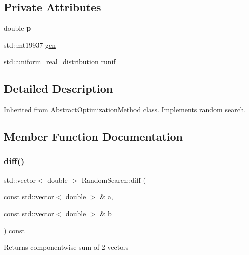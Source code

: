 \subsection*{Private Attributes}
\begin{DoxyCompactItemize}
\item 
\mbox{\label{class_random_search_a6b1a9499e9568aad8f9028f8fe04c44b}} 
double {\bfseries p}
\item 
std\+::mt19937 \hyperlink{class_random_search_ac78efe1a921aac4693fa32b69a2b6a98}{gen}
\item 
std\+::uniform\+\_\+real\+\_\+distribution \hyperlink{class_random_search_ad84bf71f0524d079d3e9f6f84d0a6dd7}{runif}
\end{DoxyCompactItemize}


\subsection{Detailed Description}
Inherited from \hyperlink{class_abstract_optimization_method}{Abstract\+Optimization\+Method} class. Implements random search. 

\subsection{Member Function Documentation}
\mbox{\label{class_random_search_a8a0a2518afe6d2ff29e8cb9d7b548edc}} 
\subsubsection{\texorpdfstring{diff()}{diff()}}
{\footnotesize\ttfamily std\+::vector$<$ double $>$ Random\+Search\+::diff (\begin{DoxyParamCaption}\item[{const std\+::vector$<$ double $>$ \&}]{a,  }\item[{const std\+::vector$<$ double $>$ \&}]{b }\end{DoxyParamCaption}) const\hspace{0.3cm}{\ttfamily [private]}}

Returns componentwise sum of 2 vectors \mbox{\label{class_random_search_a74de0911b029e12f9c02539362e39730}} 
